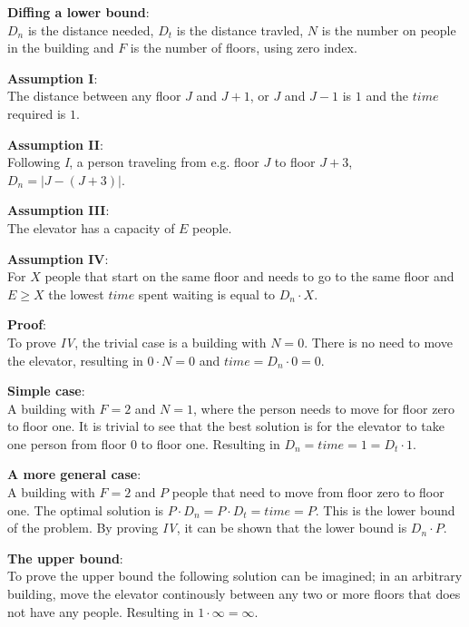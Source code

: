 
\textbf{Diffing a lower bound}:
\\
$ D_n $ is the distance needed, $ D_t $ is the distance travled, $ N $ is the number on people in the building and $ F $ is the number of floors, using zero index.

\textbf{Assumption I}:
\\
The distance between any floor $ J $ and $ J + 1 $, or  $ J $ and $ J - 1 $ is $ 1 $ and the $ time $ required is $ 1 $.

\textbf{Assumption II}:
\\
Following \textit{I}, a person traveling from e.g. floor $ J $ to floor $ J + 3 $, $ D_n = |J - ( J + 3)|$.

\textbf{Assumption III}:
\\
The elevator has a capacity of $ E $ people.

\textbf{Assumption IV}:
\\
For $ X $ people that start on the same floor and needs to go to the same floor and $ E \geq X $ the lowest $ time $ spent waiting is equal to $ D_n \cdot X $.

\textbf{Proof}:
\\
To prove \textit{IV}, the trivial case is a building with $ N = 0 $. There is no need to move the elevator, resulting in $ 0 \cdot N = 0 $ and $ time = D_n \cdot 0 = 0 $.

\textbf{Simple case}:
\\
A building with $ F = 2 $ and $ N = 1 $, where the person needs to move for floor zero to floor one. It is trivial to see that the best solution is for the elevator to take one person from floor 0 to floor one. Resulting in $ D_n = time = 1 = D_t \cdot 1 $.

\textbf{A more general case}:
\\
A building with $ F = 2 $ and $ P $ people that need to move from floor zero to floor one. The optimal solution is $ P \cdot D_n = P \cdot D_t = time = P $. This is the lower bound of the problem. By proving \textit{IV}, it can be shown that the lower bound is $ D_n \cdot P $.

\textbf{The upper bound}:
\\
To prove the upper bound the following solution can be imagined; in an arbitrary building, move the elevator continously between any two or more floors that does not have any people. Resulting in $ 1 \cdot \infty = \infty $.
